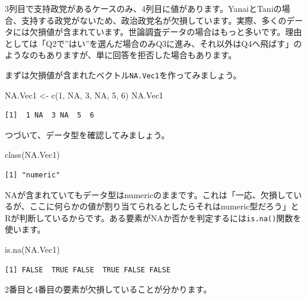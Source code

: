 \documentclass[
  a4paper,
  pandoc,
  ja=standard,
  jafont=haranoaji]{bxjsbook}
\newenvironment{Shaded}{\begin{snugshade}}{\end{snugshade}}
\newcommand{\ConstantTok}[1]{\textcolor[rgb]{0.56,0.35,0.01}{#1}}
\newcommand{\DecValTok}[1]{\textcolor[rgb]{0.68,0.00,0.00}{#1}}
\newcommand{\FunctionTok}[1]{\textcolor[rgb]{0.28,0.35,0.67}{#1}}
\newcommand{\NormalTok}[1]{\textcolor[rgb]{0.00,0.48,0.65}{#1}}
\newcommand{\OtherTok}[1]{\textcolor[rgb]{0.00,0.48,0.65}{#1}}
\begin{document}
3列目で支持政党があるケースのみ、4列目に値があります。YanaiとTaniの場合、支持する政党がないため、政治政党名が欠損しています。実際、多くのデータには欠損値が含まれています。世論調査データの場合はもっと多いです。理由としては「Q2で''はい''を選んだ場合のみQ3に進み、それ以外はQ4へ飛ばす」のようなのもありますが、単に回答を拒否した場合もあります。

まずは欠損値が含まれたベクトル\texttt{NA.Vec1}を作ってみましょう。

\begin{Shaded}
\begin{Highlighting}[numbers=left,,]
\NormalTok{NA.Vec1 }\OtherTok{\textless{}{-}} \FunctionTok{c}\NormalTok{(}\DecValTok{1}\NormalTok{, }\ConstantTok{NA}\NormalTok{, }\DecValTok{3}\NormalTok{, }\ConstantTok{NA}\NormalTok{, }\DecValTok{5}\NormalTok{, }\DecValTok{6}\NormalTok{)}
\NormalTok{NA.Vec1}
\end{Highlighting}
\end{Shaded}

\begin{verbatim}
[1]  1 NA  3 NA  5  6
\end{verbatim}

つづいて、データ型を確認してみましょう。

\begin{Shaded}
\begin{Highlighting}[numbers=left,,]
\FunctionTok{class}\NormalTok{(NA.Vec1)}
\end{Highlighting}
\end{Shaded}

\begin{verbatim}
[1] "numeric"
\end{verbatim}

NAが含まれていてもデータ型はnumericのままです。これは「一応、欠損しているが、ここに何らかの値が割り当てられるとしたらそれはnumeric型だろう」とRが判断しているからです。ある要素がNAか否かを判定するには\texttt{is.na()}関数を使います。

\begin{Shaded}
\begin{Highlighting}[numbers=left,,]
\FunctionTok{is.na}\NormalTok{(NA.Vec1)}
\end{Highlighting}
\end{Shaded}

\begin{verbatim}
[1] FALSE  TRUE FALSE  TRUE FALSE FALSE
\end{verbatim}

2番目と4番目の要素が欠損していることが分かります。
\end{document}

